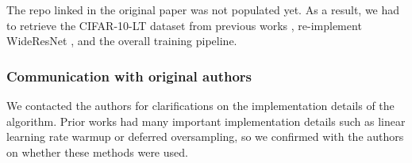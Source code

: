  The repo linked in the original paper was not populated yet. As a result, we had to retrieve the CIFAR-10-LT dataset from previous works \citep{LDAM-DRW, M2m}, re-implement WideResNet \citep{WideResNet}, and the overall training pipeline.

\subsubsection*{Communication with original authors}

We contacted the authors for clarifications on the implementation details of the algorithm. Prior works had many important implementation details such as linear learning rate warmup or deferred oversampling, so we confirmed with the authors on whether these methods were used.

